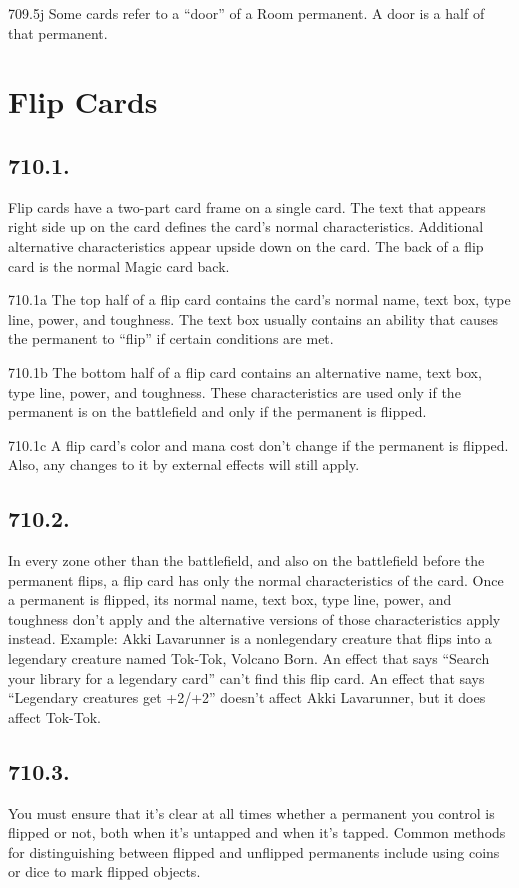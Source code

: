 709.5j Some cards refer to a “door” of a Room permanent. A door is a half of that permanent.

\section{Flip Cards}
\subsection*{710.1.}
Flip cards have a two-part card frame on a single card. The text that appears right side up on the card defines the card’s normal characteristics. Additional alternative characteristics appear upside down on the card. The back of a flip card is the normal Magic card back.

710.1a The top half of a flip card contains the card’s normal name, text box, type line, power, and toughness. The text box usually contains an ability that causes the permanent to “flip” if certain conditions are met.

710.1b The bottom half of a flip card contains an alternative name, text box, type line, power, and toughness. These characteristics are used only if the permanent is on the battlefield and only if the permanent is flipped.

710.1c A flip card’s color and mana cost don’t change if the permanent is flipped. Also, any changes to it by external effects will still apply.

\subsection*{710.2.}
In every zone other than the battlefield, and also on the battlefield before the permanent flips, a flip card has only the normal characteristics of the card. Once a permanent is flipped, its normal name, text box, type line, power, and toughness don’t apply and the alternative versions of those characteristics apply instead.
Example: Akki Lavarunner is a nonlegendary creature that flips into a legendary creature named Tok-Tok, Volcano Born. An effect that says “Search your library for a legendary card” can’t find this flip card. An effect that says “Legendary creatures get +2/+2” doesn’t affect Akki Lavarunner, but it does affect Tok-Tok.

\subsection*{710.3.}
You must ensure that it’s clear at all times whether a permanent you control is flipped or not, both when it’s untapped and when it’s tapped. Common methods for distinguishing between flipped and unflipped permanents include using coins or dice to mark flipped objects.

